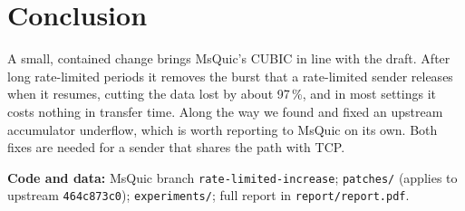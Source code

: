 \documentclass[11pt,a4paper]{article}
\begin{document}
\section{Conclusion}

A small, contained change brings MsQuic's CUBIC in line with the draft. After
long rate-limited periods it removes the burst that a rate-limited sender
releases when it resumes, cutting the data lost by about 97\,\%, and in most
settings it costs nothing in transfer time. Along the way we found and fixed
an upstream accumulator underflow, which is worth reporting to MsQuic on its
own. Both fixes are needed for a sender that shares the path with TCP.

\medskip\noindent
\small\textbf{Code and data:} MsQuic branch \texttt{rate-limited-increase};
\texttt{patches/} (applies to upstream \texttt{464c873c0});
\texttt{experiments/}; full report in \texttt{report/report.pdf}.
\end{document}
